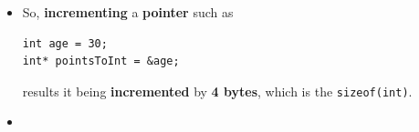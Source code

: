 \documentclass[10pt]{article}
\newcommand{\pbreak}{\vspace{30pt}}
\begin{document}
\begin{itemize}
Initially, \verb|p| points to address \verb|1000|, so:

\begin{verbatim}
*p    // 10
\end{verbatim}

After incrementing the pointer:

\begin{verbatim}
p++;
\end{verbatim}

the compiler knows that \verb|p| is an \verb|int *|, so it advances the pointer by
\verb|sizeof(int)| (4 bytes), not by 1 byte. The pointer now points to address
\verb|1004|:

\[
\begin{array}{|c|c|}
\hline
\textbf{Address} & \textbf{Value} \\
\hline
1000 & 10 \\
\mathbf{1004 \leftarrow p} & \mathbf{20} \\
1008 & 30 \\
1012 & 40 \\
\hline
\end{array}
\]

Thus,

\begin{verbatim}
*p    // 20
\end{verbatim}

Incrementing the pointer again moves it to address \verb|1008|, where:

\begin{verbatim}
*p    // 30
\end{verbatim}

\noindent
In general, for a pointer of type \verb|T *|, the operation \verb|p++| advances
the pointer by \verb|sizeof(T)| bytes, making it point to the \textbf{next object}
of type \verb|T| in memory rather than simply the next byte.

\pbreak

\item So, \textbf{incrementing} a \textbf{pointer} such as 
	\begin{verbatim}
int age = 30;
int* pointsToInt = &age;
	\end{verbatim}
	results it being \textbf{incremented} by \textbf{4 bytes}, which is the \verb|sizeof(int)|.

\item \textbf{}


\end{itemize}
\end{document}
